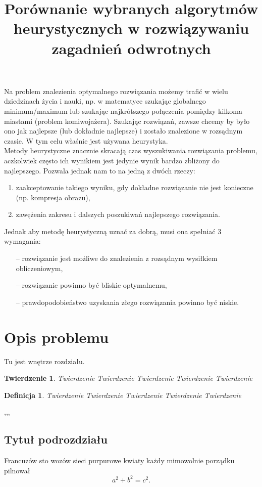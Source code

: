 \documentclass[twoside]{projektInzynierskiMS1}
\title{Porównanie wybranych algorytmów heurystycznych w rozwiązywaniu zagadnień odwrotnych}
\newcommand{\si}{ś}
\newtheorem{twa}{Twierdzenie}%
\newtheorem{dd}{Definicja}%
\begin{document}
Na problem znalezienia optymalnego rozwiązania możemy trafić w wielu dziedzinach życia i nauki, np. w matematyce szukając globalnego minimum/maximum lub szukając najkrótszego połączenia pomiędzy kilkoma miastami (problem komiwojażera). Szukając rozwiązań, zawsze chcemy by było ono jak najlepsze (lub dokładnie najlepsze) i zostało znalezione w rozsądnym czasie. W tym celu wła\si nie jest używana heurystyka.\\ 


Metody heurystyczne znacznie skracają czas wyszukiwania rozwiązania problemu, aczkolwiek często ich wynikiem jest jedynie wynik bardzo zbliżony do najlepszego. Pozwala jednak nam to na jedną z dwóch rzeczy:
\begin{enumerate}
	\item zaakceptowanie takiego wyniku, gdy dokładne rozwiązanie nie jest konieczne (np. kompresja obrazu),
	\item zawężenia zakresu i dalszych poszukiwań najlepszego rozwiązania. \\
\end{enumerate}
Jednak aby metodę heurystyczną uznać za dobrą, musi ona spełniać 3 wymagania:
\begin{itemize}
	\item[--] rozwiązanie jest możliwe do znalezienia z rozsądnym wysiłkiem obliczeniowym,
	\item[--] rozwiązanie powinno być bliskie optymalnemu,
	\item[--] prawdopodobieństwo uzyskania złego rozwiązania powinno być niskie.
\end{itemize}

\section{Opis problemu}


Tu jest wnętrze rozdziału.

\begin{twa}
Twierdzenie Twierdzenie Twierdzenie Twierdzenie Twierdzenie 
\end{twa}
\begin{dd}
Twierdzenie Twierdzenie Twierdzenie Twierdzenie Twierdzenie 
\end{dd}

\thesection,\thesubsection,\thesubsubsection,

\subsection{Tytuł podrozdziału}
Francuzów sto wozów sieci purpurowe kwiaty każdy mimowolnie porządku pilnował
\begin{equation}
a^2+b^2=c^2.
\end{equation}
\end{document}
